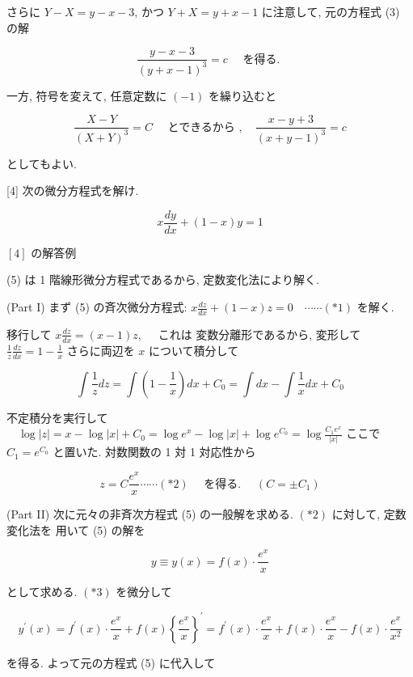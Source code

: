 \documentclass[10pt]{article}
\begin{document}
さらに $Y-X=y-x-3$, かつ $Y+X=y+x-1$ に注意して, 元の方程式 (3) の解

$$
\frac{y-x-3}{(y+x-1)^{3}}=c \quad \text { を得る. }
$$

一方, 符号を変えて, 任意定数に $(-1)$ を繰り込むと

$$
\frac{X-Y}{(X+Y)^{3}}=C \quad \text { とできるから }, \quad \frac{x-y+3}{(x+y-1)^{3}}=c
$$

としてもよい.

[4] 次の微分方程式を解け.


\begin{equation*}
x \frac{d y}{d x}+(1-x) y=1 \tag{5}
\end{equation*}


$[4]$ の解答例

(5) は 1 階線形微分方程式であるから, 定数変化法により解く.

(Part I) まず (5) の斉次微分方程式: $x \frac{d z}{d x}+(1-x) z=0 \quad \cdots \cdots(* 1)$ を解く.

移行して $x \frac{d z}{d x}=(x-1) z, \quad$ これは 変数分離形であるから, 変形して $\frac{1}{z} \frac{d z}{d x}=1-\frac{1}{x}$ さらに両辺を $x$ について積分して

$$
\int \frac{1}{z} d z=\int\left(1-\frac{1}{x}\right) d x+C_{0}=\int d x-\int \frac{1}{x} d x+C_{0}
$$

不定積分を実行して $\quad \log |z|=x-\log |x|+C_{0}=\log e^{x}-\log |x|+\log e^{C_{0}}=\log \frac{C_{1} e^{x}}{|x|}$ ここで $C_{1}=e^{C_{0}}$ と置いた. 対数関数の 1 対 1 対応性から

$$
z=C \frac{e^{x}}{x} \cdots \cdots(* 2) \quad \text { を得る. } \quad\left(C= \pm C_{1}\right)
$$

(Part II) 次に元々の非斉次方程式 (5) の一般解を求める. $(* 2)$ に対して, 定数変化法を 用いて (5) の解を


\begin{equation*}
y \equiv y(x)=f(x) \cdot \frac{e^{x}}{x} \tag{*3}
\end{equation*}


として求める. $(* 3)$ を微分して


\begin{equation*}
y^{\prime}(x)=f^{\prime}(x) \cdot \frac{e^{x}}{x}+f(x)\left\{\frac{e^{x}}{x}\right\}^{\prime}=f^{\prime}(x) \cdot \frac{e^{x}}{x}+f(x) \cdot \frac{e^{x}}{x}-f(x) \cdot \frac{e^{x}}{x^{2}} \tag{*4}
\end{equation*}


を得る. よって元の方程式 (5) に代入して
\end{document}
